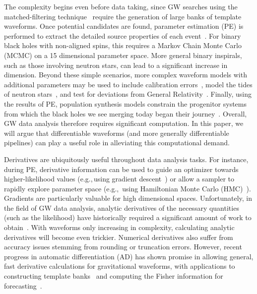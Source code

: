 \documentclass[twocolumn]{aastex631}
\begin{document}
The complexity begins even before data taking, since GW searches using the matched-filtering technique~\citep{Owen:1998dk, Owen:1995tm} require the generation of large banks of template waveforms.
Once potential candidates are found, parameter estimation (PE) is performed to extract the detailed source properties of each event~\citep{Christensen:2022bxb, 2020MNRAS.493.3132S, Ashton:2018jfp, Romero-Shaw:2020owr, Veitch:2014wba, Biwer:2018osg, kombine, 10.1093/mnras/stv2422}.
For binary black holes with non-aligned spins, this requires a Markov Chain Monte Carlo (MCMC) on a 15 dimensional parameter space.
More general binary inspirals, such as those involving neutron stars, can lead to a significant increase in dimension.
Beyond these simple scenarios, more complex waveform models with additional parameters may be used to include calibration errors~\citep{Farr:2014,Vitale:2020gvb}, model the tides of neutron stars~\citep{LIGOScientific:2018hze}, and test for deviations from General Relativity~\citep{Arun:2006yw, Agathos:2013upa, Yunes:2016jcc, LIGOScientific:2016lio, LIGOScientific:2020tif, Krishnendu:2021fga}.
Finally, using the results of PE, population synthesis models constrain the progenitor systems from which the black holes we see merging today began their journey~\citep{LIGOScientific:2020kqk, LIGOScientific:2021psn, Wong:2022flg}.
Overall, GW data analysis therefore requires significant computation.
In this paper, we will argue that differentiable waveforms (and more generally differentiable pipelines) can play a useful role in alleviating this computational demand.

Derivatives are ubiquitously useful throughout data analysis tasks.
For instance, during PE, derivative information can be used to guide an optimizer towards higher-likelihood values (e.g.,\,using gradient descent~\citep{2016arXiv160904747R}) or allow a sampler to rapidly explore parameter space (e.g.,\, using Hamiltonian Monte Carlo (HMC)~\citep{2011hmcm.book..113N,2017arXiv170102434B}).
Gradients are particularly valuable for high dimensional spaces.
Unfortunately, in the field of GW data analysis, analytic derivatives of the necessary quantities (such as the likelihood) have historically required a significant amount of work to obtain~\citep{Keppel:2013kia}.
With waveforms only increasing in complexity, calculating analytic derivatives will become even trickier.
Numerical derivatives also suffer from accuracy issues stemming from rounding or truncation errors.
However, recent progress in automatic differentiation (AD) has shown promise in allowing general, fast derivative calculations for gravitational waveforms, with applications to constructing template banks~\citep{Coogan:2022qxs} and computing the Fisher information for forecasting~\citep{Iacovelli:2022bbs, Iacovelli:2022mbg}.
\end{document}
